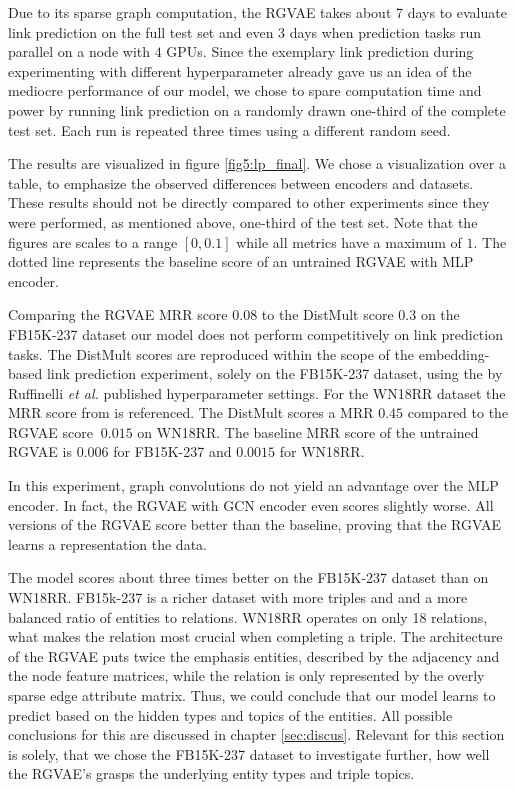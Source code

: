 Due to its sparse graph computation, the RGVAE takes about 7 days to evaluate link prediction on the full test set and even 3 days when prediction tasks run parallel on a node with $4$ GPUs. Since the exemplary link prediction during experimenting with different hyperparameter already gave us an idea of the mediocre performance of our model, we chose to spare computation time and power by running link prediction on a randomly drawn one-third of the complete test set. Each run is repeated three times using a different random seed.

The results are visualized in figure \ref{fig5:lp_final}. We chose a visualization over a table, to emphasize the observed differences between encoders and datasets. These results should not be directly compared to other experiments since they were performed, as mentioned above, one-third of the test set. Note that the figures are scales to a range $[0,0.1]$ while all metrics have a maximum of $1$. The dotted line represents the baseline score of an untrained RGVAE with MLP encoder.

Comparing the RGVAE MRR score $0.08$ to the DistMult score $0.3$ on the FB15K-237 dataset our model does not perform competitively on link prediction tasks. The DistMult scores are reproduced within the scope of the embedding-based link prediction experiment, solely on the FB15K-237 dataset, using the by Ruffinelli \textit{et al.} published hyperparameter settings. For the WN18RR dataset the MRR score from \cite{ruffinelli_you_2019} is referenced.
The DistMult scores a MRR $0.45$ compared to the RGVAE score $~0.015$ on WN18RR. 
The baseline MRR score of the untrained RGVAE is $0.006$ for FB15K-237 and $0.0015$ for WN18RR. 

In this experiment, graph convolutions do not yield an advantage over the MLP encoder. In fact, the RGVAE with GCN encoder even scores slightly worse. All versions of the RGVAE score better than the baseline, proving that the RGVAE learns a representation the data. 

The model scores about three times better on the FB15K-237 dataset than on WN18RR. FB15k-237 is a richer dataset with more triples and and a more balanced ratio of entities to relations. WN18RR operates on only 18 relations, what makes the relation most crucial when completing a triple. The architecture of the RGVAE puts twice the emphasis entities, described by the adjacency and the node feature matrices, while the relation is only represented by the overly sparse edge attribute matrix. Thus, we could conclude that our model learns to predict based on the hidden types and topics of the entities. All possible conclusions for this are discussed in chapter \ref{sec:discus}. Relevant for this section is solely, that we chose the FB15K-237 dataset to investigate further, how well the RGVAE's grasps the underlying entity types and triple topics.   

